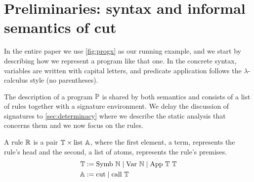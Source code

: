 \documentclass[sigplan,10pt,anonymous,review]{acmart}
\begin{document}
\section{Preliminaries: syntax and informal semantics of cut}
\label{sec:preliminaries}


In the entire paper we use \cref{fig:progx} as our running example, and
we start by describing how we represent a program like that one.
In the concrete syntax, variables are written with capital letters, and
predicate application follows the $\lambda$-calculus style (no
parentheses).

The description of a program $\mathbb{P}$ is shared by both semantics
and consists of a list of
rules together with a signature environment.
We delay the discussion of signatures to \cref{sec:determinacy} where we
describe the static analysis that concerns them and we now focus
on the rules.

A rule $\mathbb{R}$ is a pair $\mathbb{T} \times \mathrm{list}\ \mathbb{A}$, where
the first element, a term, represents the rule's head and the second,
a list of atoms, represents the rule's premises.
%
%
\begin{align*}
  \mathbb{T} & := \mathrm{Symb}\ \mathbb{N} \mid \mathrm{Var}\ \mathbb{N} \mid \mathrm{App}\ \mathbb{T}\ \mathbb{T}\\
  \mathbb{A} & := \mathrm{cut} \mid \mathrm{call}\ \mathbb{T}
\end{align*}
\end{document}
